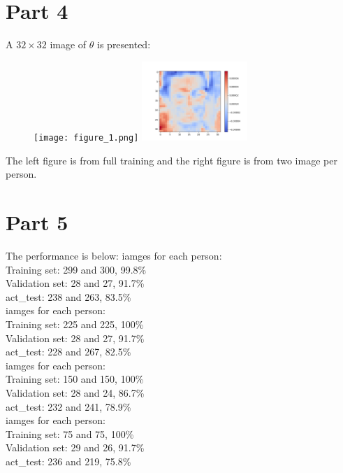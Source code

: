 \documentclass{article}
\begin{document}
\section{Part 4}
A $32\times32$ image of $\theta$ is presented:
\begin{figure}[ht!]
  \texttt{[image: figure\_1.png]}
 \hfill
  \includegraphics[width=40mm]{figure_2.png}
\end{figure}

The left figure is from full training and the right figure is from two image per person.

\clearpage
\section{Part 5}
The performance is below:
 iamges for each person:
\\Training set: 299 and 300, 99.8\%
\\Validation set: 28 and 27, 91.7\%
\\act\_test: 238 and 263, 83.5\%
\\
 iamges for each person: 
\\Training set: 225 and 225, 100\%
\\Validation set: 28 and 27, 91.7\%
\\act\_test: 228 and 267, 82.5\%
\\
 iamges for each person: 
\\Training set: 150 and 150, 100\%
\\Validation set: 28 and 24, 86.7\%
\\act\_test: 232 and 241, 78.9\%
\\
 iamges for each person: 
\\Training set: 75 and 75, 100\%
\\Validation set: 29 and 26, 91.7\%
\\act\_test: 236 and 219, 75.8\%
\\

\end{document}
